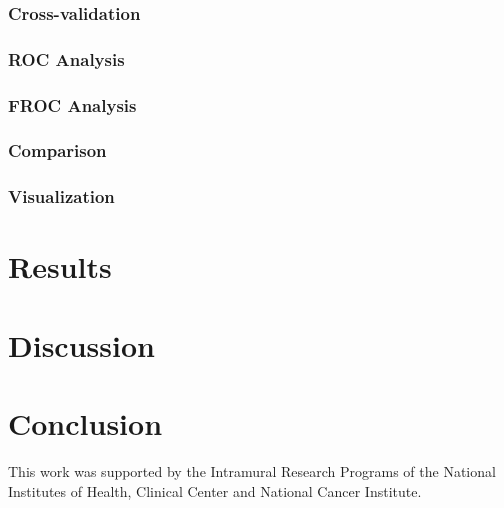 \documentclass[]{spie}  %
\begin{document}
\subsubsection{Cross-validation}
\label{sssec:validation}


\subsubsection{ROC Analysis}
\label{sssec:ROC}


\subsubsection{FROC Analysis}
\label{sssec:FROC}


\subsubsection{Comparison}
\label{sssec:compare}


\subsubsection{Visualization}
\label{sssec:vis}


\section{Results}
\label{sec:results}


\section{Discussion}
\label{sec:discussion}

\section{Conclusion}
\label{sec:conclusion}

\acknowledgments      
 
This work was supported by the Intramural Research Programs of the National Institutes of Health, Clinical Center and National Cancer Institute.   

\end{document}
